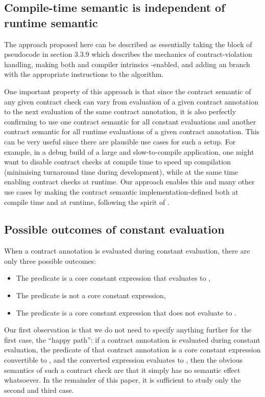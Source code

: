 \subsection{Compile-time semantic is independent of runtime semantic}

The approach proposed here can be described as essentially taking the block of pseudocode in \cite{P2900R3} section 3.3.9 which describes the mechanics of contract-violation handling, making both  and  compiler intrinsics -enabled, and adding an  branch with the appropriate instructions to the algorithm.

One important property of this approach is that since the contract semantic of any given contract check can vary from evaluation of a given contract annotation to the next evaluation of the same contract annotation, it is also perfectly confirming to use one contract semantic for all constant evaluations and another contract semantic for all runtime evaluations of a given contract annotation. This can be very useful since there are plausible use cases for such a setup. For example, in a debug build of a large and slow-to-compile application, one might want to disable contract checks at compile time to speed up compilation (minimising turnaround time during development), while at the same time enabling contract checks at runtime. Our approach enables this and many other use cases by making the contract semantic implementation-defined both at compile time and at runtime, following the spirit of \cite{P2877R0}.

\subsection{Possible outcomes of constant evaluation}

When a contract annotation is evaluated during constant evaluation, there are only three possible outcomes:
\begin{itemize}
\item The predicate is a core constant expression that evaluates to ,
\item The predicate is not a core constant expression,
\item The predicate is a core constant expression that does not evaluate to .
\end{itemize}
Our first observation is that we do not need to specify anything further for the first case, the ``happy path'': if a contract annotation is evaluated during constant evaluation, the predicate of that contract annotation is a core constant expression convertible to , and the converted expression evaluates to , then the obvious semantics of such a contract check are that it simply has no semantic effect whatsoever. In the remainder of this paper, it is sufficient to study only the second and third case.

